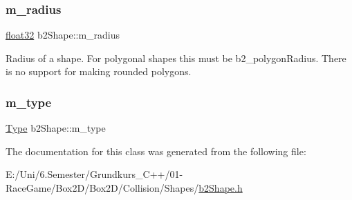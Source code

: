 \subsubsection{\texorpdfstring{m\_radius}{m\_radius}}
{\footnotesize\ttfamily \mbox{\hyperlink{b2_settings_8h_aacdc525d6f7bddb3ae95d5c311bd06a1}{float32}} b2\+Shape\+::m\+\_\+radius}

Radius of a shape. For polygonal shapes this must be b2\+\_\+polygon\+Radius. There is no support for making rounded polygons. \mbox{\label{classb2_shape_adb051791133b24f53c6e9a565a7b7bbb}} 
\subsubsection{\texorpdfstring{m\_type}{m\_type}}
{\footnotesize\ttfamily \mbox{\hyperlink{classb2_shape_a4c1f3a9ad6b3150bb90ad9018ca4b1e0}{Type}} b2\+Shape\+::m\+\_\+type}



The documentation for this class was generated from the following file\+:\begin{DoxyCompactItemize}
\item 
E\+:/\+Uni/6.\+Semester/\+Grundkurs\+\_\+\+C++/01-\/\+Race\+Game/\+Box2\+D/\+Box2\+D/\+Collision/\+Shapes/\mbox{\hyperlink{b2_shape_8h}{b2\+Shape.\+h}}\end{DoxyCompactItemize}
